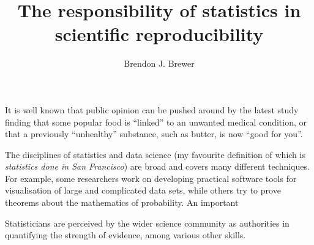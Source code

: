 \documentclass[a4paper, 11pt]{article}
\title{The responsibility of statistics in scientific reproducibility}
\author{Brendon J. Brewer}
\begin{document}
\maketitle

It is well known that public opinion can be pushed around by the latest study
finding that some popular food is ``linked'' to an unwanted medical condition,
or that a previously ``unhealthy'' substance, such as butter, is now
``good for you''.

The disciplines of statistics and data science
(my favourite definition of which is {\it statistics done in San Francisco})
are broad and covers many different techniques. For example, some researchers
work on developing practical software tools for visualisation of large and
complicated data sets, while others try to prove theorems about the mathematics
of probability. An important 


Statisticians are perceived by the wider science community as authorities in
quantifying the strength of evidence, among various other skills.
\end{document}
